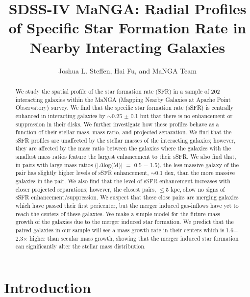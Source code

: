 \documentclass[iop,revtex4,twocolumn,apj,numberedappendix,appendixfloats]{emulateapj}
\begin{document}
\title{SDSS-IV MaNGA: Radial Profiles of Specific Star Formation Rate in Nearby Interacting Galaxies}

\author{
Joshua L. Steffen, 
Hai Fu, and 
MaNGA Team 
}

\begin{abstract}
We study the spatial profile of the star formation rate (SFR) in a sample of 202 interacting galaxies within the MaNGA (Mapping Nearby Galaxies at Apache Point Observatory) survey. We find that the specific star formation rate (sSFR) is centrally enhanced in interacting galaxies by $\sim$0.25 $\pm$ 0.1 but that there is no enhancement or suppression in their disks. We further investigate how these profiles behave as a function of their stellar mass, mass ratio, and projected separation. We find that the sSFR profiles are unaffected by the stellar masses of the interacting galaxies; however, they are affected by the mass ratio between the galaxies where the galaxies with the smallest mass ratios feature the largest enhancement to their sSFR. We also find that, in pairs with large mass ratios ($|\Delta$log(M)$|$ $=$ 0.5 $-$ 1.5), the less massive galaxy of the pair has slightly higher levels of sSFR enhancement, $\sim$0.1 dex, than the more massive galaxies in the pair. We also find that the level of sSFR enhancement increases with closer projected separations; however, the closest pairs, $\le$5 kpc, show no signs of sSFR enhancement/suppression. We suspect that these close pairs are merging galaxies which have passed their first pericenter, but the merger induced gas-inflows have yet to reach the centers of these galaxies. We make a simple model for the future mass growth of the galaxies due to the merger induced star formation. We predict that the paired galaxies in our sample will see a mass growth rate in their centers which is 1.6$-$2.3$\times$ higher than secular mass growth, showing that the merger induced star formation can significantly alter the stellar mass distribution. 
\end{abstract}


\section{Introduction}\label{sec:intro}
\end{document}
